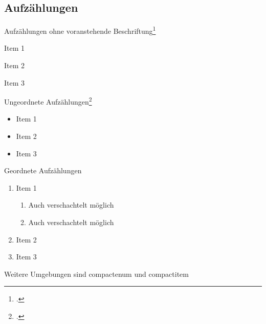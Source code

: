 \subsection{Aufzählungen}\label{subsec:lists}
	
Aufzählungen ohne voranstehende Beschriftung\footcite{einstein2}
	
\begin{description}
	\item{Item 1}
	\item{Item 2}
	\item{Item 3}
\end{description}
	
Ungeordnete Aufzählungen\footcite{gates}
	
\begin{itemize}
	\item{Item 1}
	\item{Item 2}
	\item{Item 3}
\end{itemize}
	
Geordnete Aufzählungen 
	
\begin{enumerate} %
	\item{Item 1}
	\begin{enumerate}
		\item Auch verschachtelt möglich
		\item Auch verschachtelt möglich
	\end{enumerate}
	\item{Item 2}
	\item{Item 3}
\end{enumerate}
	
Weitere Umgebungen sind compactenum und compactitem